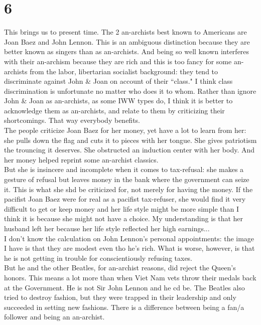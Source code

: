 \section*{6}
This brings us to present time. The 2 an-archists best known to Americans are Joan Baez and John Lennon. This is an ambiguous distinction because they are better known as singers than as an-archists. And being so well known interferes with their an-archism because they are rich and this is too fancy for some an-archists from the labor, libertarian socialist background: they tend to discriminate against John \& Joan on account of their ``class." I think class discrimination is unfortunate no matter who does it to whom. Rather than ignore John \& Joan as an-archists, as some IWW types do, I think it is better to acknowledge them as an-archists, and relate to them by criticizing their shortcomings. That way everybody benefits.\\
The people criticize Joan Baez for her money, yet have a lot to learn from her: she pulls down the flag and cuts it to pieces with her tongue. She gives patriotism the trouncing it deserves. She obstructed an induction center with her body. And her money helped reprint some an-archist classics.\\
But she is insincere and incomplete when it comes to tax-refusal: she makes a gesture of refusal but leaves money in the bank where the government can seize it. This is what she shd be criticized for, not merely for having the money. If the pacifist Joan Baez were for real as a pacifist tax-refuser, she would find it very difficult to get or keep money and her life style might be more simple than I think it is because she might not have a choice. My understanding is that her husband left her because her life style reflected her high earnings...\\
I don't know the calculation on John Lennon's personal appointments: the image I have is that they are modest even tho he's rich. What is worse, however, is that he is not getting in trouble for conscientiously refusing taxes.\\
But he and the other Beatles, for an-archist reasons, did reject the Queen's honors. This means a lot more than when Viet Nam vets throw their medals back at the Government. He is not Sir John Lennon and he cd be. The Beatles also tried to destroy fashion, but they were trapped in their leadership and only succeeded in setting new fashions. There is a difference between being a fan/a follower and being an an-archist.\\
